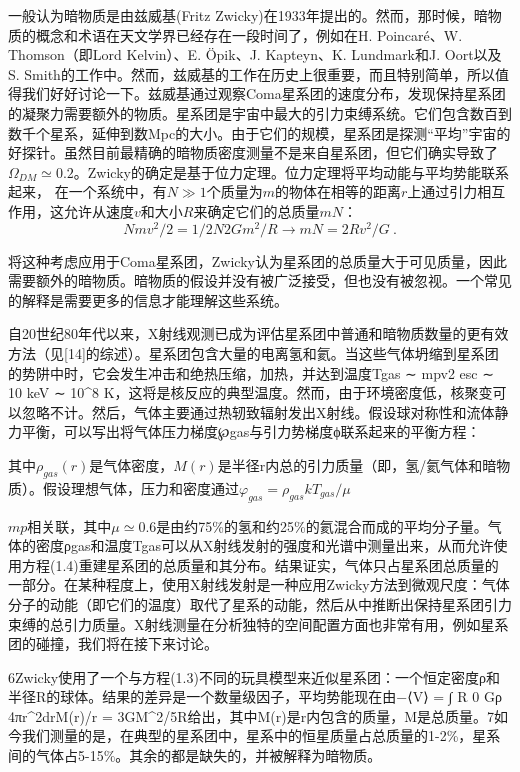 

一般认为暗物质是由兹威基(Fritz Zwicky)在1933年提出的。然而，那时候，暗物质的概念和术语在天文学界已经存在一段时间了，例如在H. Poincaré、W. Thomson（即Lord Kelvin）、E. Öpik、J. Kapteyn、K. Lundmark和J. Oort以及S. Smith的工作中。然而，兹威基的工作在历史上很重要，而且特别简单，所以值得我们好好讨论一下。兹威基通过观察Coma星系团的速度分布，发现保持星系团的凝聚力需要额外的物质。星系团是宇宙中最大的引力束缚系统。它们包含数百到数千个星系，延伸到数Mpc的大小。由于它们的规模，星系团是探测“平均”宇宙的好探针。虽然目前最精确的暗物质密度测量不是来自星系团，但它们确实导致了$\Omega_{DM} \simeq 0.2$。Zwicky的确定是基于位力定理。位力定理将平均动能与平均势能联系起来，%
在一个系统中，有$N \gg 1$个质量为$m$的物体在相等的距离$r$上通过引力相互作用，这允许从速度$v$和大小$R$来确定它们的总质量$mN$：
\begin{equation}
N mv^2 / 2 = 1/2 N2 G m^2 / R \rightarrow mN = 2R v^2 / G  ~.
\end{equation}


将这种考虑应用于Coma星系团，Zwicky认为星系团的总质量大于可见质量，因此需要额外的暗物质。暗物质的假设并没有被广泛接受，但也没有被忽视。一个常见的解释是需要更多的信息才能理解这些系统。

自20世纪80年代以来，X射线观测已成为评估星系团中普通和暗物质数量的更有效方法（见[14]的综述）。星系团包含大量的电离氢和氦。当这些气体坍缩到星系团的势阱中时，它会发生冲击和绝热压缩，加热，并达到温度Tgas ∼ mpv2 esc ∼ 10 keV ∼ 10^8 K，这将是核反应的典型温度。然而，由于环境密度低，核聚变可以忽略不计。然后，气体主要通过热轫致辐射发出X射线。假设球对称性和流体静力平衡，可以写出将气体压力梯度℘gas与引力势梯度ϕ联系起来的平衡方程：
 

其中$\rho_{gas}(r)$是气体密度，$M(r)$是半径r内总的引力质量（即，氢/氦气体和暗物质）。假设理想气体，压力和密度通过$\varphi_{gas} = \rho_{gas}kT_{gas}/\mu$

$mp$相关联，其中$\mu\simeq 0.6$是由约75\%的氢和约25\%的氦混合而成的平均分子量。气体的密度ρgas和温度Tgas可以从X射线发射的强度和光谱中测量出来，从而允许使用方程(1.4)重建星系团的总质量和其分布。结果证实，气体只占星系团总质量的一部分。在某种程度上，使用X射线发射是一种应用Zwicky方法到微观尺度：气体分子的动能（即它们的温度）取代了星系的动能，然后从中推断出保持星系团引力束缚的总引力质量。X射线测量在分析独特的空间配置方面也非常有用，例如星系团的碰撞，我们将在接下来讨论。

6Zwicky使用了一个与方程(1.3)不同的玩具模型来近似星系团：一个恒定密度ρ和半径R的球体。结果的差异是一个数量级因子，平均势能现在由−⟨V⟩ = ∫ R 0 Gρ 4πr^2drM(r)/r = 3GM^2/5R给出，其中M(r)是r内包含的质量，M是总质量。7如今我们测量的是，在典型的星系团中，星系中的恒星质量占总质量的1-2\%，星系间的气体占5-15\%。其余的都是缺失的，并被解释为暗物质。